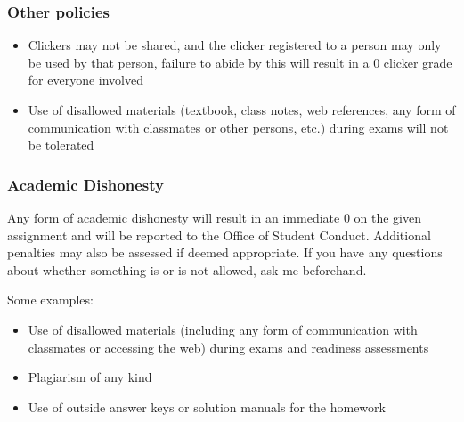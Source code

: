 \documentclass[slidestop,compress,mathserif,12pt,t,professionalfonts,xcolor=table]{beamer}
\begin{document}
\begin{frame}
\frametitle{Other policies}

\begin{itemize}

\item Clickers may not be shared, and the clicker registered to a person may only be used by that person, failure to abide by this will result in a 0 clicker grade for everyone involved

\item Use of disallowed materials (textbook, class notes, web references, any form of communication with classmates or other persons, etc.) during exams will not be tolerated

\end{itemize}

\end{frame}


\begin{frame}
\frametitle{Academic Dishonesty}

Any form of academic dishonesty will result in an immediate 0 on the given assignment and will be reported to the Office of Student Conduct. Additional penalties may also be assessed if deemed appropriate. If you have any questions about whether something is or is not allowed, ask me beforehand.

Some examples:

\begin{itemize}

\item Use of disallowed materials (including any form of communication with classmates or accessing the web) during exams and readiness assessments

\item Plagiarism of any kind

\item Use of outside answer keys or solution manuals for the homework

\end{itemize}

\end{frame}

\end{document}

